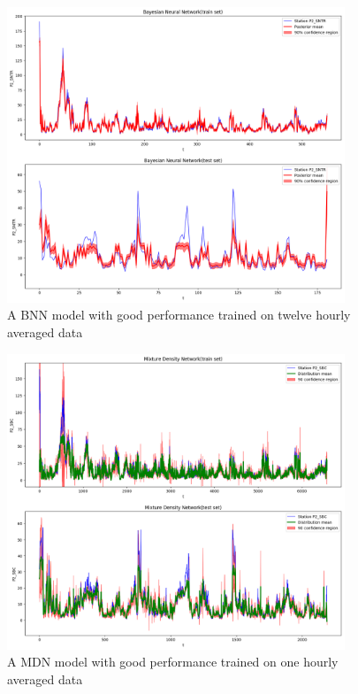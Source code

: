 \documentclass[12pt,a4paper,twoside]{scrartcl}
\numberwithin{equation}{section}
\newcounter{mypagecount}%
\newenvironment{interlude}{%
  \clearpage
  \setcounter{mypagecount}{\value{page}}%
  \thispagestyle{empty}%
  \pagestyle{empty}%
}{%
  \clearpage
  \setcounter{page}{\value{mypagecount}}%
}
\begin{document}
\begin{interlude}
\begin{appendices}
\begin{center}
\begin{figure}[h!]
        \includegraphics[height=0.6\textwidth, width=0.9\textwidth]{figures/model_plots/bnn_12h}
        \caption[BNN twelve hours plot]{A BNN model with good performance trained on twelve hourly averaged data}\label{fig:bnn-plot-12h}
      \end{figure}
    \end{center}
    \begin{center}
      \begin{figure}[h!]
        \centering
        \includegraphics[height=0.6\textwidth, width=0.9\textwidth]{figures/model_plots/mdn_1h}
        \caption[MDN one hour plot]{A MDN model with good performance trained on one hourly averaged data}\label{fig:mdn-plot-1h}
      \end{figure}
    \end{center} 
    \begin{center}
      \begin{figure}[htpb]
        \centering

\end{figure}
\end{center}
\end{appendices}
\end{interlude}
\end{document}
